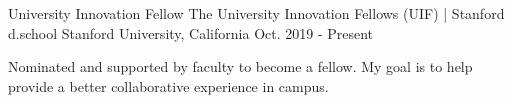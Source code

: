 

\begin{cventries}
  \cventry
    {University Innovation Fellow} %
    {The University Innovation Fellows (UIF) | Stanford d.school } %
    {Stanford University, California} %
    {Oct. 2019 - Present} %
    {
    \begin{cvitems} %
        \item {Nominated and supported by faculty to become a fellow. My goal is to help provide a better collaborative experience in campus.}
     \end{cvitems}
    }
    

\end{cventries}
